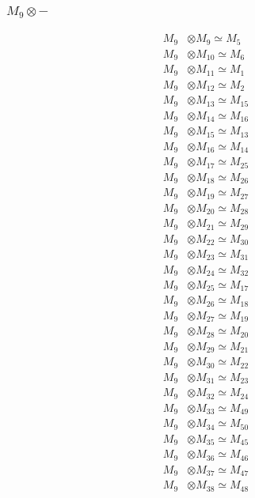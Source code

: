 \subsubsection{$ M_{9}\otimes -$}
\begin{align*}
M_{9} &\otimes M_{9} \simeq M_{5} \\
M_{9} &\otimes M_{10} \simeq M_{6} \\
M_{9} &\otimes M_{11} \simeq M_{1} \\
M_{9} &\otimes M_{12} \simeq M_{2} \\
M_{9} &\otimes M_{13} \simeq M_{15} \\
M_{9} &\otimes M_{14} \simeq M_{16} \\
M_{9} &\otimes M_{15} \simeq M_{13} \\
M_{9} &\otimes M_{16} \simeq M_{14} \\
M_{9} &\otimes M_{17} \simeq M_{25} \\
M_{9} &\otimes M_{18} \simeq M_{26} \\
M_{9} &\otimes M_{19} \simeq M_{27} \\
M_{9} &\otimes M_{20} \simeq M_{28} \\
M_{9} &\otimes M_{21} \simeq M_{29} \\
M_{9} &\otimes M_{22} \simeq M_{30} \\
M_{9} &\otimes M_{23} \simeq M_{31} \\
M_{9} &\otimes M_{24} \simeq M_{32} \\
M_{9} &\otimes M_{25} \simeq M_{17} \\
M_{9} &\otimes M_{26} \simeq M_{18} \\
M_{9} &\otimes M_{27} \simeq M_{19} \\
M_{9} &\otimes M_{28} \simeq M_{20} \\
M_{9} &\otimes M_{29} \simeq M_{21} \\
M_{9} &\otimes M_{30} \simeq M_{22} \\
M_{9} &\otimes M_{31} \simeq M_{23} \\
M_{9} &\otimes M_{32} \simeq M_{24} \\
M_{9} &\otimes M_{33} \simeq M_{49} \\
M_{9} &\otimes M_{34} \simeq M_{50} \\
M_{9} &\otimes M_{35} \simeq M_{45} \\
M_{9} &\otimes M_{36} \simeq M_{46} \\
M_{9} &\otimes M_{37} \simeq M_{47} \\
M_{9} &\otimes M_{38} \simeq M_{48} \\

\end{align*}
